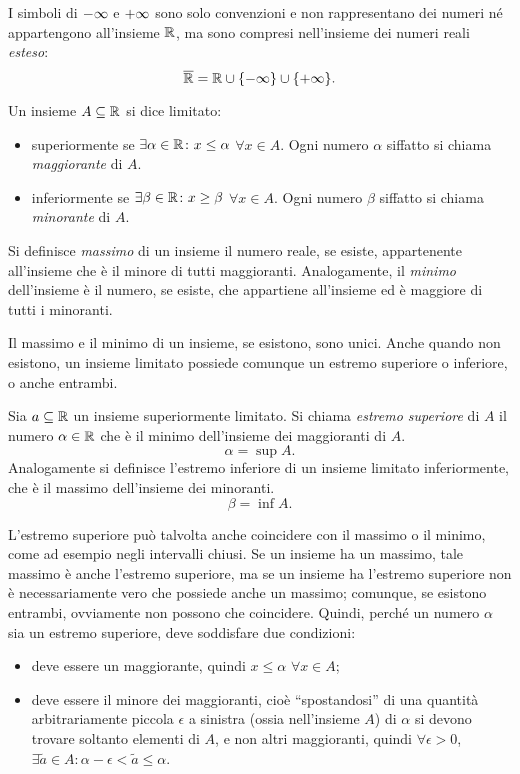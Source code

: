 I simboli di $-\infty$ e $+\infty$ sono solo convenzioni e non rappresentano dei numeri né appartengono all'insieme $\mathbb{R}$, ma sono compresi nell'insieme dei numeri reali \emph{esteso}:
\[
\overline{\mathbb{R}}=\mathbb{R}\cup\{-\infty\}\cup\{+\infty\}.
\]
\begin{definizione}
Un insieme $A\subseteq\mathbb{R}$ si dice limitato:
\begin{itemize}
\item superiormente se $\exists\alpha\in\mathbb{R}\colon x\leq\alpha$ $\forall x\in A$. Ogni numero $\alpha$ siffatto si chiama \emph{maggiorante} di $A$.
\item inferiormente se $\exists\beta\in\mathbb{R}\colon x\geq\beta$ $\forall x\in A$. Ogni numero $\beta$ siffatto si chiama \emph{minorante} di $A$.
\end{itemize}
\end{definizione}
\begin{definizione}
Si definisce \emph{massimo} di un insieme il numero reale, se esiste, appartenente all'insieme che è il minore di tutti maggioranti.
Analogamente, il \emph{minimo} dell'insieme è il numero, se esiste, che appartiene all'insieme ed è maggiore di tutti i minoranti.
\end{definizione}
Il massimo e il minimo di un insieme, se esistono, sono unici. Anche quando non esistono, un insieme limitato possiede comunque un estremo superiore o inferiore, o anche entrambi.
\begin{definizione}
Sia $a\subseteq\mathbb{R}$ un insieme superiormente limitato. Si chiama \emph{estremo superiore} di $A$ il numero $\alpha\in\mathbb{R}$ che è il minimo dell'insieme dei maggioranti di $A$.
\[
\alpha=\sup A.
\]
Analogamente si definisce l'estremo inferiore di un insieme limitato inferiormente, che è il massimo dell'insieme dei minoranti.
\[
\beta=\inf A.
\]
\end{definizione}
L'estremo superiore può talvolta anche coincidere con il massimo o il minimo, come ad esempio negli intervalli chiusi. Se un insieme ha un massimo, tale massimo è anche l'estremo superiore, ma se un insieme ha l'estremo superiore non è necessariamente vero che possiede anche un massimo; comunque, se esistono entrambi, ovviamente non possono che coincidere.
Quindi, perché un numero $\alpha$ sia un estremo superiore, deve soddisfare due condizioni:
\begin{itemize}
\item deve essere un maggiorante, quindi $x\leq\alpha$ $\forall x\in A$;
\item deve essere il minore dei maggioranti, cioè ``spostandosi'' di una quantità arbitrariamente piccola $\epsilon$ a sinistra (ossia nell'insieme $A$) di $\alpha$ si devono trovare soltanto elementi di $A$, e non altri maggioranti, quindi $\forall\epsilon>0$, $\exists\tilde{a}\in A\colon\alpha-\epsilon<\tilde{a}\leq\alpha$.
\end{itemize}
